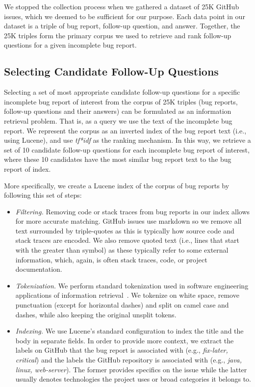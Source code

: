  We stopped the collection process when we gathered a dataset of 25K GitHub issues, which we deemed to be sufficient for our purpose. Each data point in our dataset is a triple of
bug report, follow-up question, and answer. Together, the 25K triples form the primary corpus we used to
retrieve and rank follow-up questions for a given incomplete bug report.


\subsection{Selecting Candidate Follow-Up Questions}

Selecting a set of most appropriate candidate follow-up questions for a specific incomplete bug report of interest from the corpus
of 25K triples (bug reports, follow-up questions and their answers) can be formulated as an information retrieval
problem. That is, as a query we use the text of the incomplete bug report. We represent the corpus
as an inverted index of the bug report text (i.e., using Lucene), and use {\em tf*idf} as the
ranking mechanism. In this way, we retrieve a set of 10 candidate follow-up questions for each incomplete bug report
of interest, where these 10 candidates have the most similar bug report text to the bug report of index.

More specifically, we create a Lucene index of the corpus of bug reports by following this set of steps:
\begin{itemize}
\item {\em Filtering.} Removing code or stack traces from bug reports in our index allows
for more accurate matching. GitHub issues use markdown so we remove all text surrounded
by triple-quotes as this is typically how source code and stack traces are encoded. We also
remove quoted text (i.e., lines that start with the greater than symbol) as these typically
refer to some external information, which, again, is often stack traces, code, or project documentation.
\item {\em Tokenization.} We perform standard tokenization used in software engineering applications
of information retrieval~\cite{marcus2004information,shepherd2012sando}. We tokenize on white space, remove
punctuation (except for horizontal dashes)
and split on camel case and dashes, while also keeping the original unsplit tokens.
\item {\em Indexing.} We use Lucene's standard configuration to index the title and the body in separate fields. In order to provide
more context, we extract the labels on GitHub that the bug report is associated with (e.g., {\em fix-later, critical}) and the labels the
GitHub repository is associated with (e.g., {\em java, linux, web-server}). The former provides specifics on the issue while the
latter usually denotes technologies the project uses or broad categories it belongs to.
\end{itemize}

